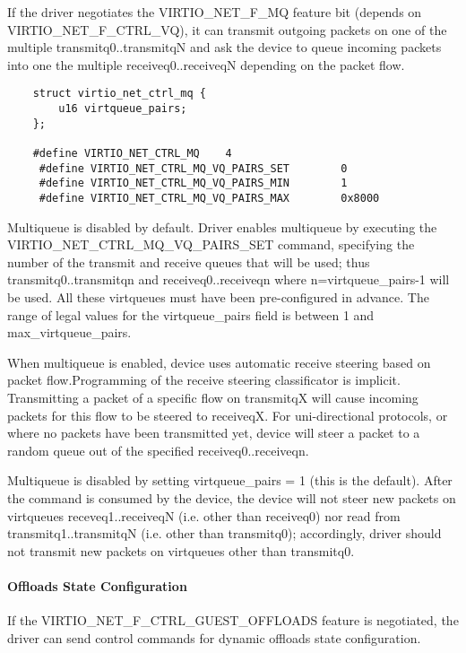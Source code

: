 If the driver negotiates the VIRTIO_NET_F_MQ feature bit (depends
on VIRTIO_NET_F_CTRL_VQ), it can transmit outgoing packets on one
of the multiple transmitq0..transmitqN and ask the device to
queue incoming packets into one the multiple receiveq0..receiveqN
depending on the packet flow.

\begin{lstlisting}
	struct virtio_net_ctrl_mq {
		u16 virtqueue_pairs;
	};

	#define VIRTIO_NET_CTRL_MQ    4
	 #define VIRTIO_NET_CTRL_MQ_VQ_PAIRS_SET        0
	 #define VIRTIO_NET_CTRL_MQ_VQ_PAIRS_MIN        1
	 #define VIRTIO_NET_CTRL_MQ_VQ_PAIRS_MAX        0x8000
\end{lstlisting}

Multiqueue is disabled by default. Driver enables multiqueue by
executing the VIRTIO_NET_CTRL_MQ_VQ_PAIRS_SET command, specifying
the number of the transmit and receive queues that will be used;
thus transmitq0..transmitqn and receiveq0..receiveqn where
n=virtqueue_pairs-1 will be used. All these virtqueues must have
been pre-configured in advance. The range of legal values for the
virtqueue_pairs field is between 1 and max_virtqueue_pairs.

When multiqueue is enabled, device uses automatic receive steering
based on packet flow.Programming of the receive steering
classificator is implicit. Transmitting a packet of a specific
flow on transmitqX will cause incoming packets for this flow to
be steered to receiveqX. For uni-directional protocols, or where
no packets have been transmitted yet, device will steer a packet
to a random queue out of the specified receiveq0..receiveqn.

Multiqueue is disabled by setting virtqueue_pairs = 1 (this is
the default). After the command is consumed by the device, the
device will not steer new packets on virtqueues
receveq1..receiveqN (i.e. other than receiveq0) nor read from
transmitq1..transmitqN (i.e. other than transmitq0); accordingly,
driver should not transmit new packets on virtqueues other than
transmitq0.

\paragraph{Offloads State Configuration}\label{sec:Device Types / Network Device / Device Operation / Control Virtqueue / Offloads State Configuration}

If the VIRTIO_NET_F_CTRL_GUEST_OFFLOADS feature is negotiated, the driver can
send control commands for dynamic offloads state configuration.

